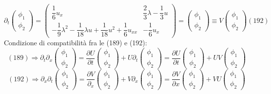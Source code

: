 \documentclass[a4paper,11pt]{report}
\begin{document}
\begin{equation}
\partial_t\left(\begin{matrix}
\phi_1 \\
\phi_2
\end{matrix} \right) = \left( \begin{matrix}
\dfrac{1}{6}u_x & \dfrac{2}{3}\lambda - \dfrac{1}{3}u \\
-\dfrac{1}{9}\lambda^2 - \dfrac{1}{18} \lambda u + \dfrac{1}{18}u^2 + \dfrac{1}{6}u_{xx} & - \dfrac{1}{6}u_x
\end{matrix}\right)=\left(\begin{matrix}
\phi_1 \\
\phi_2
\end{matrix} \right) \equiv V \left(\begin{matrix}
\phi_1 \\
\phi_2
\end{matrix} \right)(192)
\end{equation}
Condizione di compatibilità fra le (189) e (192):
$$
(189)\Rightarrow \partial_t \partial_x \left(\begin{matrix}
\phi_1 \\
\phi_2
\end{matrix} \right) = \dfrac{\partial U}{\partial t}\left(\begin{matrix}
\phi_1 \\
\phi_2
\end{matrix} \right) + U\partial_t \left(\begin{matrix}
\phi_1 \\
\phi_2
\end{matrix} \right) = \dfrac{\partial U}{\partial t}\left(\begin{matrix}
\phi_1 \\
\phi_2
\end{matrix} \right) + UV \left(\begin{matrix}
\phi_1 \\
\phi_2
\end{matrix} \right)
$$
$$
(192) \Rightarrow \partial_x\partial_t\left(\begin{matrix}
\phi_1 \\
\phi_2
\end{matrix} \right)=\dfrac{\partial V}{\partial_x}\left(\begin{matrix}
\phi_1 \\
\phi_2
\end{matrix} \right) + V\partial_x \left(\begin{matrix}
\phi_1 \\
\phi_2
\end{matrix} \right) =\dfrac{\partial V}{\partial x}\left(\begin{matrix}
\phi_1 \\
\phi_2
\end{matrix} \right) + VU \left(\begin{matrix}
\phi_1 \\
\phi_2
\end{matrix} \right)
$$
\end{document}
